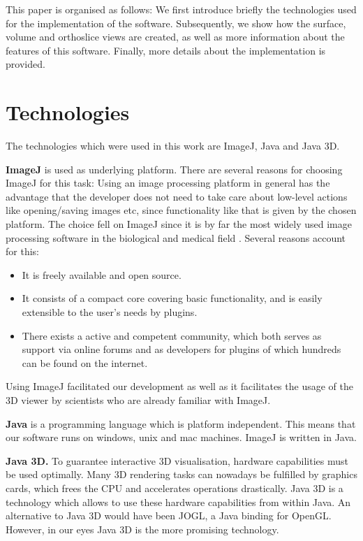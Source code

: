\documentclass[a4paper,10pt]{article}
\begin{document}
This paper is organised as follows: We first introduce briefly the technologies used for the implementation of the software. Subsequently, we show how the surface, volume and orthoslice views are created, as well as more information about the features of this software. Finally, more details about the implementation is provided.


\section{Technologies}
The technologies which were used in this work are ImageJ, Java and Java 3D.

\textbf{ImageJ} \cite{imagej} is used as underlying platform. There are several reasons for choosing ImageJ for this task: Using an image processing platform in general has the advantage that the developer does not need to take care about low-level actions like opening/saving images etc, since functionality like that is given by the chosen platform. The choice fell on ImageJ since it is by far the most widely used image processing software in the biological and medical field \cite{mbf}. Several reasons account for this:
\begin{itemize}
\item It is freely available and open source.
\item It consists of a compact core covering basic functionality, and is easily extensible to the user's needs by plugins.
\item There exists a active and competent community, which both serves as support via online forums and as developers for plugins of which hundreds can be found on the internet.
\end{itemize}
Using ImageJ facilitated our development as well as it facilitates the usage of the 3D viewer by scientists who are already familiar with ImageJ.

\textbf{Java} \cite{java} is a programming language which is platform independent. This means that our software runs on windows, unix and mac machines. ImageJ is written in Java.

\textbf{Java 3D.} To guarantee interactive 3D visualisation, hardware capabilities must be used optimally. Many 3D rendering tasks can nowadays be fulfilled by graphics cards, which frees the CPU and accelerates operations drastically. Java 3D \cite{java3d} is a technology which allows to use these hardware capabilities from within Java. An alternative to Java 3D would have been JOGL, a Java binding for OpenGL. However, in our eyes Java 3D is the more promising technology.
\end{document}

